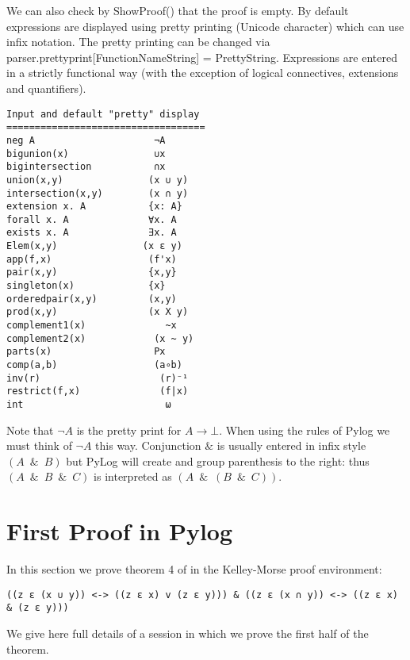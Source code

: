 \documentclass[12pt,leqno]{article}
\numberwithin{equation}{section}
\begin{document}
We can also check by ShowProof() that the proof is empty. By default expressions are displayed using pretty printing (Unicode character) which can use infix notation.  The pretty printing can be changed via parser.prettyprint[FunctionNameString] = PrettyString. Expressions are entered in a strictly functional way (with the exception of logical connectives, extensions and quantifiers). 

\begin{verbatim}
Input and default "pretty" display
===================================
neg A                     ¬A  
bigunion(x)               ∪x
bigintersection           ∩x
union(x,y)               (x ∪ y)
intersection(x,y)        (x ∩ y)
extension x. A           {x: A}
forall x. A              ∀x. A
exists x. A              ∃x. A
Elem(x,y)               (x ε y)
app(f,x)                 (f'x)
pair(x,y)                {x,y}
singleton(x)             {x}
orderedpair(x,y)         (x,y)
prod(x,y)                (x X y)
complement1(x)              ~x
complement2(x)            (x ~ y)
parts(x)                  Px
comp(a,b)                 (a∘b) 
inv(r)                     (r)⁻¹ 
restrict(f,x)              (f|x)
int                         ω

\end{verbatim}

Note that $\neg A$ is the pretty print for $A\rightarrow \bot$. When using the rules of Pylog
we must think of $\neg A$ this way.
Conjunction $\&$ is usually entered in infix style $(A\enspace \& \enspace B)$ but PyLog will create and group parenthesis to the right: thus $(A \enspace \& \enspace B\enspace  \& \enspace C)$ is interpreted as $(A\enspace \& \enspace (B \enspace \& \enspace C))$.

\section*{First Proof in Pylog}

In this section we prove theorem 4 of \cite{kel} in the Kelley-Morse proof environment:
\begin{verbatim}
((z ε (x ∪ y)) <-> ((z ε x) v (z ε y))) & ((z ε (x ∩ y)) <-> ((z ε x) & (z ε y)))
\end{verbatim}

We give here full  details of a session in which we prove the first half of the theorem.
\end{document}

